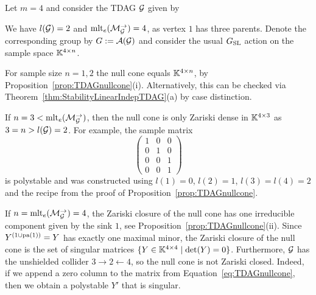 \begin{example}\label{ex:TDAGnullcone}
	Let $m = 4$ and consider the TDAG $\mathcal{G}$ given by
		\begin{center}
		\end{center}
	We have $l(\mathcal{G}) = 2$ and $\operatorname{mlt}_e(\mathcal{M}_{\mathcal{G}}^{\to}) = 4$, as vertex $1$ has three parents. Denote the corresponding group by $G := \mathcal{A}(\mathcal{G})$ and consider the usual $G_{\operatorname{SL}}$ action on the sample space $\mathbb K^{4 \times n}$.
	
	For sample size $n=1,2 $ the null cone equals $\mathbb K^{4 \times n}$, by Proposition~\ref{prop:TDAGnullcone}(i). Alternatively, this can be checked via Theorem~\ref{thm:StabilityLinearIndepTDAG}(a) by case distinction.
	
	If $n=3 < \operatorname{mlt}_e(\mathcal{M}_{\mathcal{G}}^{\to})$, then the null cone is only Zariski dense in $\mathbb K^{4 \times 3}$ as $3 = n > l(\mathcal{G}) = 2$. For example, the sample matrix
		\begin{equation}\label{eq:TDAGnullcone}
			\begin{pmatrix}
				1 & 0 & 0  \\
				0 & 1 & 0  \\
				0 & 0 & 1  \\
				0 & 0 & 1 
			\end{pmatrix}
		\end{equation}
	is polystable and was constructed using $l(1)=0$, $l(2) =1$, $l(3)=l(4)=2$ and the recipe from the proof of Proposition~\ref{prop:TDAGnullcone}.
	
	If $n= \operatorname{mlt}_e(\mathcal{M}_{\mathcal{G}}^{\to}) = 4$, the Zariski closure of the null cone has one irreducible component given by the sink $1$, see Proposition~\ref{prop:TDAGnullcone}(ii). Since $Y^{(1 \cup \operatorname{pa}(1))} = Y$ has exactly one maximal minor, the Zariski closure of the null cone is the set of singular matrices $\{Y \in \mathbb K^{4 \times 4} \mid \det(Y) = 0\}$. Furthermore, $\mathcal{G}$ has the unshielded collider $3 \to 2 \leftarrow 4$, so the null cone is not Zariski closed. Indeed, if we append a zero column to the matrix from Equation~\eqref{eq:TDAGnullcone}, then we obtain a polystable $Y'$ that is singular.
	\hfill\exSymbol
\end{example}

